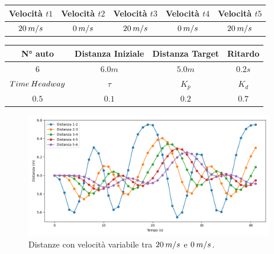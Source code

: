 \begin{table}[h]
    \centering
    \begin{tabular}{|c|c|c|c|c|}
        \hline
        Velocità $t1$ & Velocità $t2$ & Velocità $t3$ &Velocità $t4$ &Velocità $t5$\\
        \hline
            $20\hspace{0.2em}m/s$ & $0\hspace{0.2em}m/s$ & $20\hspace{0.2em}m/s$ & $0\hspace{0.2em}m/s$ & $20\hspace{0.2em}m/s$ \\
        \hline
    \end{tabular}
\end{table}
\begin{table}[h]
    \centering
    \begin{tabular}{|c|c|c|c|}
        \hline
        N° auto & Distanza Iniziale & Distanza Target & Ritardo \\
        \hline
        $6$ & $6.0 m$ & $5.0 m$ & $0.2 s$ \\
        \hline
        $Time\hspace{0.2em}Headway$ & $\tau$ & $K_p$ & $K_d$ \\
        \hline
        $0.5$ & $0.1$ & $0.2$ & $0.7$ \\
        \hline
    \end{tabular}
\end{table}

\begin{figure}[H]
    \includegraphics[width=0.96\textwidth]{images/5-experiment/velocity/distance_20-0-20-0-20.png}
    \caption{Distanze con velocità variabile tra $20\hspace{0.2em}m/s$ e $0\hspace{0.2em}m/s$.}
    \label{fig:20-0-variabvelocity-distance}
\end{figure}

